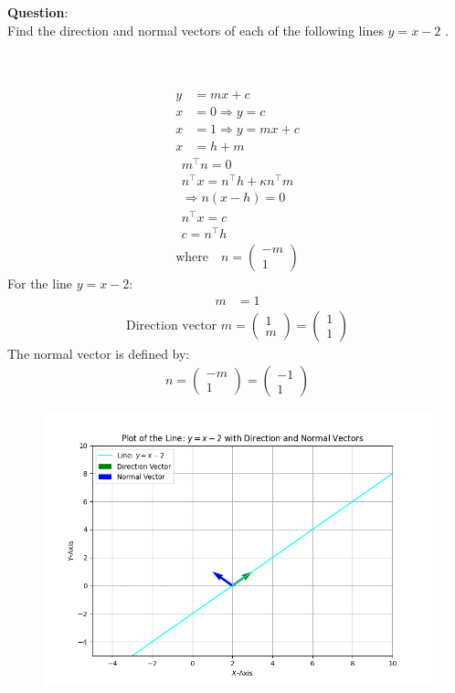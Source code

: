 \documentclass[journal]{IEEEtran}
\begin{document}
\textbf{Question}:\\
Find the direction and normal vectors of each of the following lines $y=x-2$ .
\\ \solution \\
    \begin{table}[h!]    
      \centering
      
      \caption{}
    \end{table}\\
\begin{align}
    y &= mx + c \\
    x &= 0 \Rightarrow y = c \\
    x &= 1 \Rightarrow y = mx + c \\
    x &= h + m  
\end{align}
\begin{align}
    m^\top n = 0\\
    n^\top x = n^\top h + \kappa n^\top m \\
    \Rightarrow n (x - h) = 0 \\
    n^\top x = c \\
    c = n^\top h 
\end{align}
\begin{align}
    \text{where} \quad n =\begin{pmatrix}-m \\1\end{pmatrix}
\end{align}
For the line \( y = x - 2 \):
\begin{align}
m &= 1
\end{align}
\begin{align}
\text{Direction vector } m = \begin{pmatrix} 1 \\ m \end{pmatrix} = \begin{pmatrix} 1 \\ 1 \end{pmatrix} 
\end{align}
The normal vector is defined by:
\begin{align}
n = \begin{pmatrix} -m \\ 1 \end{pmatrix} = \begin{pmatrix} -1 \\ 1 \end{pmatrix}
\end{align}
    \begin{figure}[h]
       \centering
       \includegraphics[width=\linewidth]{figs/fig1.png}
       \caption{}
       \label{graph}
    \end{figure}
\end{document}
